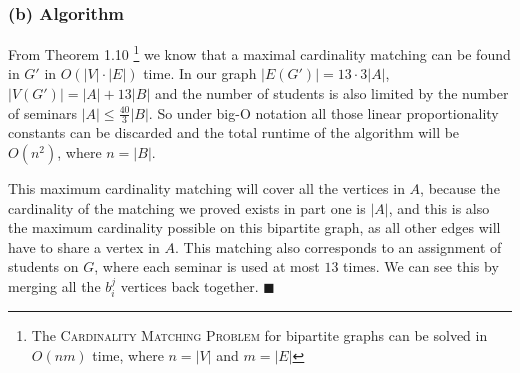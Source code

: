 \documentclass{article}
\begin{document}


  \subsubsection*{(b) Algorithm}

  From Theorem 1.10
  \footnote{The \textsc{Cardinality Matching Problem} for bipartite graphs can be solved in $O(nm)$ time, where $n = |V|$ and $m = |E|$}
  we know that a maximal cardinality matching can be found in $G'$ in $O(|V| \cdot |E|)$ time.
  In our graph $|E(G')| = 13 \cdot 3|A|$, $|V(G')| = |A| + 13|B|$ and the number of students is also limited by the number of seminars
  $|A| \leq \frac{40}{3} |B|$.
  So under big-O notation all those linear proportionality constants can be discarded
  and the total runtime of the algorithm will be $O(n^2)$, where $n = |B|$.

  This maximum cardinality matching will cover all the vertices in $A$,
  because the cardinality of the matching we proved exists in part one is $|A|$,
  and this is also the maximum cardinality possible on this bipartite graph, as all other edges will have to share a vertex in $A$.
  This matching also corresponds to an assignment of students on $G$, where each seminar is used at most $13$ times.
  We can see this by merging all the $b_i^j$ vertices back together.
  $\blacksquare$
\end{document}
